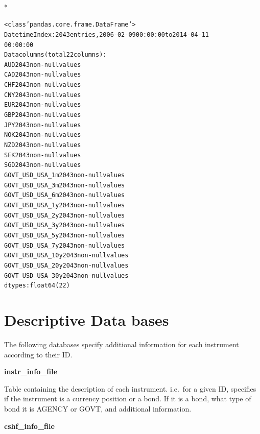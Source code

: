\documentclass[letterpaper,10pt,english]{/anaconda/lib/python2.7/site-packages/sphinx/texinputs/sphinxhowto}
\def\smaller{\fontsize{9.5pt}{9.5pt}\selectfont}
\newenvironment{InvisibleVerbatim}
        {\begin{mdframed}[leftmargin=0.1\linewidth,innerleftmargin=3pt,innerrightmargin=3pt, userdefinedwidth=1\linewidth, linewidth=0pt, linecolor=white, usetwoside=false]}
        {\end{mdframed}}
\begin{document}
                \makebox[0.1\linewidth]{\smaller\hfill\tt\color{nbframe-out-prompt}Out\hspace{4pt}{[}19{]}:\hspace{4pt}}\\*
                \vspace{-2.55\baselineskip}\begin{InvisibleVerbatim}
                \vspace{-0.5\baselineskip}
\begin{alltt}<class 'pandas.core.frame.DataFrame'>
DatetimeIndex: 2043 entries, 2006-02-09 00:00:00 to 2014-04-11
00:00:00
Data columns (total 22 columns):
AUD                 2043  non-null values
CAD                 2043  non-null values
CHF                 2043  non-null values
CNY                 2043  non-null values
EUR                 2043  non-null values
GBP                 2043  non-null values
JPY                 2043  non-null values
NOK                 2043  non-null values
NZD                 2043  non-null values
SEK                 2043  non-null values
SGD                 2043  non-null values
GOVT\_USD\_USA\_1m     2043  non-null values
GOVT\_USD\_USA\_3m     2043  non-null values
GOVT\_USD\_USA\_6m     2043  non-null values
GOVT\_USD\_USA\_1y     2043  non-null values
GOVT\_USD\_USA\_2y     2043  non-null values
GOVT\_USD\_USA\_3y     2043  non-null values
GOVT\_USD\_USA\_5y     2043  non-null values
GOVT\_USD\_USA\_7y     2043  non-null values
GOVT\_USD\_USA\_10y    2043  non-null values
GOVT\_USD\_USA\_20y    2043  non-null values
GOVT\_USD\_USA\_30y    2043  non-null values
dtypes: float64(22)\end{alltt}

            \end{InvisibleVerbatim}
            
        
    
\part{Descriptive Data bases}The following databases specify additional information for each
instrument according to their ID.

\textbf{instr\_info\_file}

Table containing the description of each instrument. i.e.~for a given
ID, specifies if the instrument is a currency position or a bond. If it
is a bond, what type of bond it is AGENCY or GOVT, and additional
information.

\textbf{cshf\_info\_file}
\end{document}
